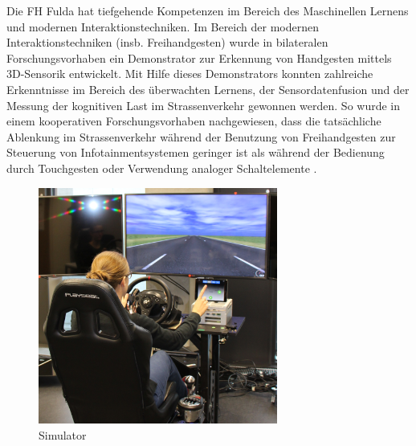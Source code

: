 \documentclass{article}
\begin{document}
Die FH Fulda hat tiefgehende Kompetenzen im Bereich des Maschinellen Lernens und modernen Interaktionstechniken. Im Bereich der modernen Interaktionstechniken (insb. Freihandgesten) wurde in bilateralen Forschungsvorhaben ein Demonstrator zur Erkennung von Handgesten mittels 3D-Sensorik entwickelt. Mit Hilfe dieses Demonstrators konnten zahlreiche Erkenntnisse im Bereich des überwachten Lernens, der Sensordatenfusion und der Messung der kognitiven Last im Strassenverkehr gewonnen werden. So wurde in einem kooperativen Forschungsvorhaben nachgewiesen, dass die tatsächliche Ablenkung im Strassenverkehr während der Benutzung von Freihandgesten zur Steuerung von Infotainmentsystemen geringer ist als während der Bedienung durch Touchgesten oder Verwendung analoger Schaltelemente \cite{kopinski2016touch}. 

\begin{figure}[ht]
	\centering
  \includegraphics[width=0.7\textwidth]{images/simulator.png}
	\caption{Simulator}
	\label{fig1}
\end{figure}
\end{document}
